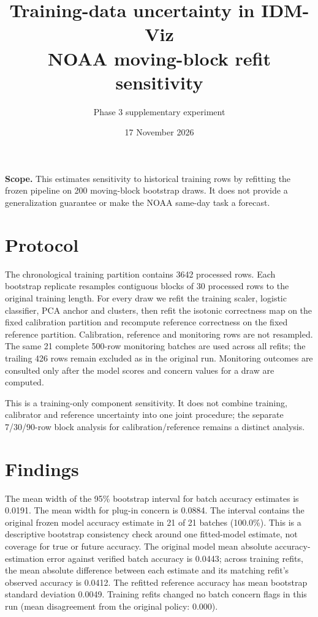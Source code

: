 \documentclass[10pt,a4paper]{article}
\title{\vspace{-2em}\color{ink}\bfseries Training-data uncertainty in IDM-Viz\\[.2em]\large NOAA moving-block refit sensitivity}
\author{Phase 3 supplementary experiment}\date{17 November 2026}
\begin{document}
\maketitle\vspace{-1em}
\begin{tcolorbox}[colback=mist,colframe=teal,boxrule=0pt,leftrule=2mm]\textbf{Scope.} This estimates sensitivity to historical training rows by refitting the frozen pipeline on 200 moving-block bootstrap draws. It does not provide a generalization guarantee or make the NOAA same-day task a forecast.
\end{tcolorbox}
\section*{Protocol}
The chronological training partition contains 3642{} processed rows. Each bootstrap replicate resamples contiguous blocks of 30{} processed rows to the original training length. For every draw we refit the training scaler, logistic classifier, PCA anchor and clusters, then refit the isotonic correctness map on the fixed calibration partition and recompute reference correctness on the fixed reference partition. Calibration, reference and monitoring rows are not resampled. The same 21 complete 500-row monitoring batches are used across all refits; the trailing 426 rows remain excluded as in the original run. Monitoring outcomes are consulted only after the model scores and concern values for a draw are computed.

This is a training-only component sensitivity. It does not combine training, calibrator and reference uncertainty into one joint procedure; the separate 7/30/90-row block analysis for calibration/reference remains a distinct analysis.
\section*{Findings}
The mean width of the 95\% bootstrap interval for batch accuracy estimates is 0.0191. The mean width for plug-in concern is 0.0884. The interval contains the original frozen model accuracy estimate in 21{} of 21 batches (100.0\%). This is a descriptive bootstrap consistency check around one fitted-model estimate, not coverage for true or future accuracy. The original model mean absolute accuracy-estimation error against verified batch accuracy is 0.0443; across training refits, the mean absolute difference between each estimate and its matching refit's observed accuracy is 0.0412. The refitted reference accuracy has mean bootstrap standard deviation 0.0049. Training refits changed no batch concern flags in this run (mean disagreement from the original policy: 0.000).
\end{document}
